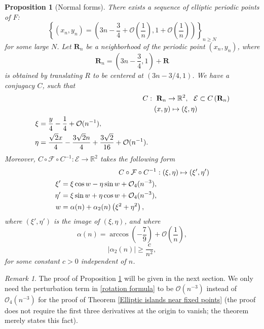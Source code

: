 \documentclass{article}
\numberwithin{figure}{section}
\numberwithin{equation}{section}
\newtheorem{main}{Proposition}
\theoremstyle{remark}
\newtheorem*{remark}{Remark}
\theoremstyle{definition}
\begin{document}
\begin{main} [Normal forms]\label{normal form near fixed point}
	There exists a sequence of elliptic periodic points of $F$: 
	$$\left\{\left(x_n,y_n\right)=\left(3n-\frac{3}{4}+\mathcal{O}\left(\frac{1}{n}\right),1+\mathcal{O}\left(\frac{1}{n}\right)\right)\right\}_{n\geq N}$$
for some large $N$. 
	Let $\mathbf{R}_{n}$ be a neighborhood of the periodic point $(x_n,y_n)$, where 
	\[ \mathbf{R}_{n} = \left( 3n - \frac{3}{4} ,1  \right)+\mathbf{R}\]	is obtained by translating $R$ to be centered at $\left(3n-3/4,1\right)$.
	We have a conjugacy $C$, such that
	\begin{align}\label{elllptic formula}
		C&:\ \mathbf{R}_n \rightarrow \mathbb{R}^2,\ \  {\mathcal{E}} \subset C\left(\mathbf{R}_n\right)\notag \\
		&\ \  \left(x,y\right) \mapsto \left(\xi,\eta\right)\notag\\
		\begin{split}
		\xi&=\frac{y}{4}-\frac{1}{4}+\mathcal{O}(n^{-1}),\\
		\eta&=\frac{\sqrt{2}x}{4}-\frac{3\sqrt{2}n}{4}+\frac{3\sqrt{2}}{16}+\mathcal{O}(n^{-1}).
		\end{split}
	\end{align}
	Moreover, \(C\circ \mathcal{F} \circ C^{-1}: {\mathcal{E}} \rightarrow \mathbb{R}^2\) takes the following form
	\begin{align}\label{rotation formula}
	 C\circ \mathcal{F} \circ C^{-1}&:\left(\xi,\eta\right) \mapsto \left(\xi',\eta'\right)\notag\\
	 \begin{split}
	 		\xi' &= \xi\cos w - \eta\sin w + \mathcal{O}_{4}(n^{-3}),\\
	 	\eta' &= \xi\sin w + \eta\cos w + \mathcal{O}_{4}(n^{-3}),\\
	 	w &= \alpha(n) + \alpha_{2}(n)\left( \xi^{2} + \eta^{2} \right),
	 \end{split}
	\end{align}
	where \((\xi',\eta')\) is the image of
	\((\xi,\eta)\), and where
	\[\alpha(n) = \arccos\left( - \frac{7}{9} \right)+\mathcal{O}\left( \frac{1}{n} \right),\]
	\[|\alpha_{2}(n)| \geq \frac{c}{n^{2}},\]
	for some constant \(c > 0\) independent of \(n\).
\end{main}

\begin{remark}
	The proof of {\color{red}Proposition \ref{normal form near fixed point}} will be given in the next section. {\color{red}We only need the perturbation term in \ref{rotation formula} to be $\mathcal{O}\left(n^{-3}\right)$ instead of $\mathcal{O}_{4}(n^{-3})$ for the proof of Theorem \ref{Elliptic islands near fixed points} (the proof does not require the first three derivatives at the origin to vanish; the theorem merely states this fact).}
\end{remark}
\end{document}
